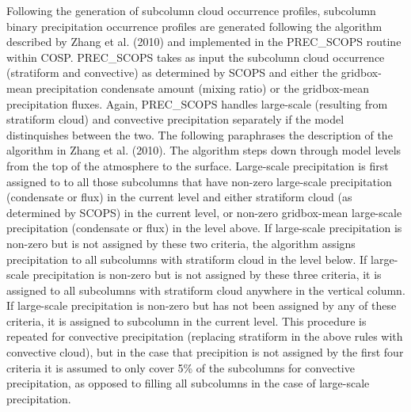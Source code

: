 Following the generation of subcolumn cloud occurrence profiles,
subcolumn binary precipitation occurrence profiles are generated
following the algorithm described by Zhang et al. (2010) and implemented
in the PREC\_SCOPS routine within COSP. PREC\_SCOPS takes as input the
subcolumn cloud occurrence (stratiform and convective) as determined by
SCOPS and either the gridbox-mean precipitation condensate amount
(mixing ratio) or the gridbox-mean precipitation fluxes. Again,
PREC\_SCOPS handles large-scale (resulting from stratiform cloud) and
convective precipitation separately if the model distinquishes between
the two. The following paraphrases the description of the algorithm in
Zhang et al. (2010). The algorithm steps down through model levels from
the top of the atmosphere to the surface. Large-scale precipitation is
first assigned to to all those subcolumns that have non-zero large-scale
precipitation (condensate or flux) in the current level and either
stratiform cloud (as determined by SCOPS) in the current level, or
non-zero gridbox-mean large-scale precipitation (condensate or flux) in
the level above. If large-scale precipitation is non-zero but is not
assigned by these two criteria, the algorithm assigns precipitation to
all subcolumns with stratiform cloud in the level below. If large-scale
precipitation is non-zero but is not assigned by these three criteria,
it is assigned to all subcolumns with stratiform cloud anywhere in the
vertical column. If large-scale precipitation is non-zero but has not
been assigned by any of these criteria, it is assigned to subcolumn in
the current level. This procedure is repeated for convective
precipitation (replacing stratiform in the above rules with convective
cloud), but in the case that precipition is not assigned by the first
four criteria it is assumed to only cover 5\% of the subcolumns for
convective precipitation, as opposed to filling all subcolumns in the
case of large-scale precipitation.

